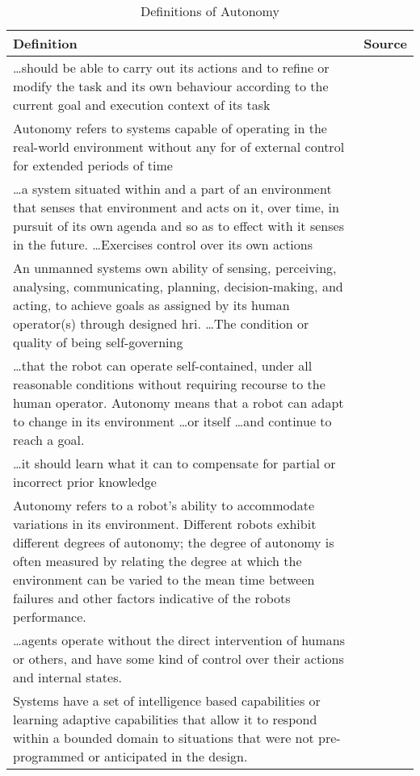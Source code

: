 \begin{table}\centering
  \caption{Definitions of Autonomy}
  \label{tab:autonomy_definitions}
  \begin{tabularx}{\textwidth}{X p{3cm}}\toprule
    Definition & Source \\ \midrule
    \ldots should be able to carry out its actions and to refine or modify the task and its own behaviour according to the current goal and execution context of its task & \citet{Alami1998}\\
    Autonomy refers to systems capable of operating in the real-world environment without any for of external control for extended periods of time & \citet{Bekey2005}\\
    \ldots a system situated within and a part of an environment that senses that environment and acts on it, over time, in pursuit of its own agenda and so as to effect with it senses in the future. \ldots Exercises control over its own actions & \citet{Franklin1997} \\
    An unmanned systems own ability of sensing, perceiving, analysing, communicating, planning, decision-making, and acting, to achieve goals as assigned by its human operator(s) through designed \gls{hri}. \ldots The condition or quality of being self-governing & \citet{Huang2004}\\
    \ldots that the robot can operate self-contained, under all reasonable conditions without requiring recourse to the human operator. Autonomy means that a robot can adapt to change in its environment \ldots or itself \ldots and continue to reach a goal. & \citet{Murphy2000}\\
    \ldots it should learn what it can to compensate for partial or incorrect prior knowledge & \citet{Russell2009} \\
    Autonomy refers to a robot's ability to accommodate variations in its environment. Different robots exhibit different degrees of autonomy; the degree of autonomy is often measured by relating the degree at which the environment can be varied to the mean time between failures and other factors indicative of the robots performance. & \citet{Thrun2004}\\
    \ldots agents operate without the direct intervention of humans or others, and have some kind of control over their actions and internal states. & \citet{Wooldridge1995}\\
    Systems have a set of intelligence based capabilities or learning adaptive capabilities that allow it to respond within a bounded domain to situations that were not pre-programmed or anticipated in the design. & \citet{Fox2014}\\\bottomrule
  \end{tabularx}
\end{table}


